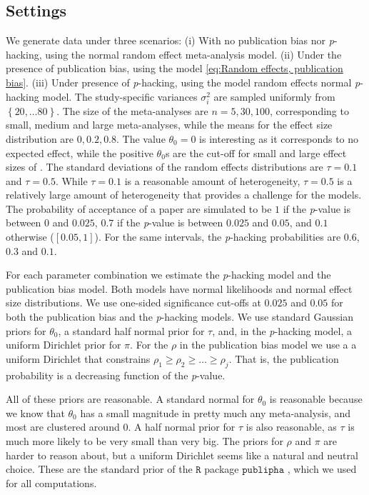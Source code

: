 \documentclass{article}
\theoremstyle{plain}
\theoremstyle{definition}
\begin{document}
\subsection{Settings}
We generate data under three scenarios: (i) With no publication bias nor \textit{p}-hacking, using the normal random effect meta-analysis model. (ii) Under the presence of publication bias, using the model \eqref{eq:Random effects, publication bias}. (iii) Under presence of \textit{p}-hacking, using the model random effects normal \textit{p}-hacking model. The study-specific variances $\sigma_{i}^{2}$ are sampled uniformly from $\left\{ 20,\ldots80\right\} $. The size of the meta-analyses are $n = 5, 30, 100$, corresponding to small, medium and large meta-analyses, while the means for the effect size distribution are $0, 0.2, 0.8$. The value $\theta_0 = 0$ is interesting as it corresponds to no expected effect, while the positive $\theta_0$s are the cut-off for small and large effect sizes of \citet[][pages 24 -- 27]{cohen1988statistical}. The standard deviations of the random effects distributions are $\tau=0.1$ and $\tau=0.5$. While $\tau = 0.1$ is a reasonable amount of heterogeneity, $\tau=0.5$ is a relatively large amount of heterogeneity that provides a challenge for the models. The probability of acceptance of a paper are simulated to be $1$ if the \emph{p}-value is between $0$ and $0.025$, $0.7$ if the \emph{p}-value is between $0.025$ and $0.05$, and $0.1$ otherwise ($[0.05, 1]$). For the same intervals, the \textit{p}-hacking probabilities are $0.6$, $0.3$ and $0.1$.

For each parameter combination we estimate the \textit{p}-hacking model and the publication bias model. Both models have normal likelihoods and normal effect size distributions. We use one-sided significance cut-offs at $0.025$ and $0.05$ for both the publication bias and the \textit{p}-hacking models. We use standard Gaussian priors for $\theta_0$, a standard half normal prior for $\tau$, and, in the \textit{p}-hacking model, a uniform Dirichlet prior for $\pi$. For the $\rho$ in the publication bias model we use a a uniform Dirichlet that constrains $\rho_{1}\geq\rho_{2}\geq\ldots\geq\rho_{j}$. That is, the publication probability is a decreasing function of the \emph{p}-value.

All of these priors are reasonable. A standard normal for $\theta_0$ is reasonable because we know that $\theta_0$ has a small magnitude in pretty much any meta-analysis, and most are clustered around $0$. A half normal prior for $\tau$ is also reasonable, as $\tau$ is much more likely to be very small than very big. The priors for $\rho$ and $\pi$ are harder to reason about, but a uniform Dirichlet seems like a natural and neutral choice. These are the standard prior of the $\mathtt{R}$ package $\mathtt{publipha}$ \citep{publipha}, which we used for all computations.
\end{document}
